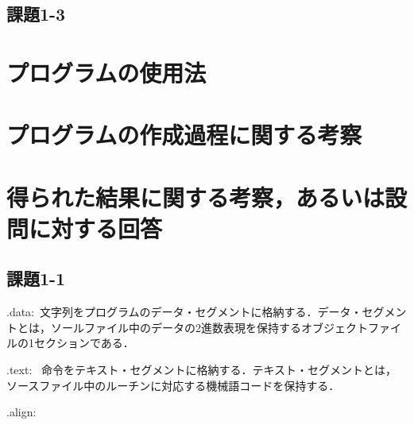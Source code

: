\documentclass[9pt]{jarticle}
\begin{document}
\subsection{課題1-3}




\section{プログラムの使用法}





\section{プログラムの作成過程に関する考察}




\section{得られた結果に関する考察，あるいは設問に対する回答}

\subsection{課題1-1}
.data:\ 文字列をプログラムのデータ・セグメントに格納する．データ・セグメントとは，ソールファイル中のデータの2進数表現を保持するオブジェクトファイルの1セクションである．

.text: \ 命令をテキスト・セグメントに格納する．テキスト・セグメントとは，ソースファイル中のルーチンに対応する機械語コードを保持する．

.align: \ 
\end{document}
